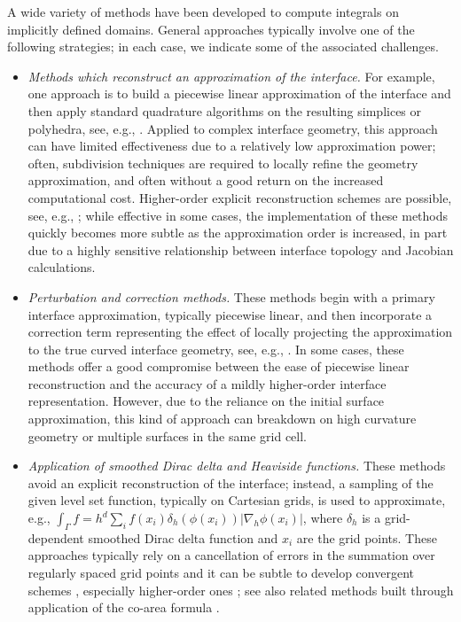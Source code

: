 \documentclass[onefignum,onetabnum,onealgnum,oneeqnum]{siamart190516}
\begin{document}
A wide variety of methods have been developed to compute integrals on implicitly defined domains. General approaches typically involve one of the following strategies; in each case, we indicate some of the associated challenges.
\begin{itemize}
\item \textit{Methods which reconstruct an approximation of the interface.} For example, one approach is to build a piecewise linear approximation of the interface %
and then apply standard quadrature algorithms on the resulting simplices or polyhedra, %
see, e.g., \cite{MinGibou2007,HoldychNobleSecor,Ventura}. Applied to complex interface geometry, this approach can have limited effectiveness due to a relatively low approximation power; often, subdivision techniques are required to locally refine the geometry approximation, and often without a good return on the increased computational cost. %
Higher-order explicit reconstruction schemes are possible, see, e.g., \cite{doi:10.1137/17M1126370,ENGVALL201783,ChengFries,10.1002/nme.5121,FRIES2017759,BOCHKOV20191156}; while effective in some cases, the implementation of these methods quickly becomes more subtle as the approximation order is increased, in part due to a highly sensitive relationship between interface topology and Jacobian calculations. %

\item \textit{Perturbation and correction methods.} These methods begin with a primary interface approximation, typically piecewise linear, and then incorporate a correction term %
representing the effect of locally projecting the approximation to the true curved interface geometry,
see, e.g., \cite{LEHRENFELD2016716,SCHOLZ2019112577,scholz2020high,THIAGARAJAN20141682,doi:10.1098/rspa.2016.0401}. In some cases, these methods offer a good compromise between the ease of piecewise linear reconstruction and the accuracy of a mildly higher-order interface representation. However, due to the reliance on the initial surface approximation, this kind of approach can breakdown on high curvature geometry or multiple surfaces in the same grid cell.

\item \textit{Application of smoothed Dirac delta and Heaviside functions.} These methods avoid an explicit reconstruction of the interface; instead, a sampling of the given level set function, typically on Cartesian grids, is used to approximate, e.g., $\int_\Gamma f = h^d \sum_i f(x_i) \delta_h(\phi(x_i)) |\nabla_h \phi(x_i)|$, where $\delta_h$ is a grid-dependent smoothed Dirac delta function and $x_i$ are the grid points. These approaches typically rely on a cancellation of errors in the summation over regularly spaced grid points and it can be subtle to develop convergent schemes \cite{TornbergEngquist,EngquistTornbergTsai,Smereka,Towers,ZahediTornberg,MinGibou2008}, especially higher-order ones \cite{Wen2008,Wen2009,Wen2010}; see also related methods built through application of the co-area formula \cite{doi:10.1137/16M1102227,KublikTsai,10.1115/1.4039639,10.1115/1.4047355}. %


\end{itemize}
\end{document}
